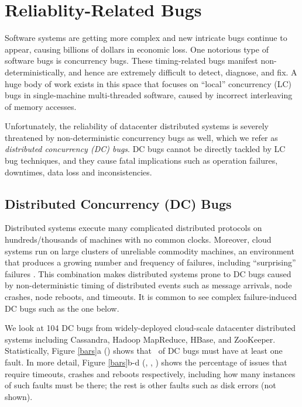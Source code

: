 \section{Reliablity-Related Bugs}

Software systems are getting more complex and new intricate bugs continue to
appear, causing billions of dollars in economic loss.  One notorious type of
software bugs is concurrency bugs.  These timing-related bugs manifest
non-deterministically, and hence are extremely difficult to detect, diagnose,
and fix.  A huge body of work exists in this space that focuses on ``local''
concurrency (LC) bugs in single-machine multi-threaded software, caused by
incorrect interleaving of memory accesses.

Unfortunately, the reliability of datacenter distributed systems is severely
threatened by non-deterministic concurrency bugs as well, which we refer as
{\em distributed concurrency (DC) bugs}.  
%
DC bugs cannot be directly tackled by LC bug techniques, and they cause fatal
implications such as operation failures, downtimes, data loss and
inconsistencies. 

\subsection{Distributed Concurrency (DC) Bugs}

Distributed systems execute many complicated distributed protocols on
hundreds/thousands of machines with no common clocks. Moreover, cloud systems
run on large clusters of unreliable commodity machines, an environment that
produces a growing number and frequency of failures, including ``surprising''
failures \cite{Birman+09-CloudAgenda, Henry09-AmazonFUD}.  This combination
makes distributed systems prone to DC bugs caused by non-deterministic timing
of distributed events such as message arrivals, node crashes, node reboots, and
timeouts. It is common to see complex failure-induced DC bugs such as the one
below.



We look at 104 DC bugs from widely-deployed cloud-scale datacenter distributed
systems including Cassandra, Hadoop MapReduce, HBase, and ZooKeeper.
Statistically, Figure \ref{bars}a (\BFLT) shows that \pctFaultYes\ of
DC bugs must have at least one fault.  In more detail, Figure
\ref{bars}b-d (\BTO, \BCR, \BRB) shows the percentage of issues that
require timeouts, crashes and reboots respectively, including how many
instances of such faults must be there; the rest is other faults such
as disk errors (not shown).


